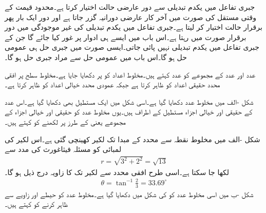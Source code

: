 جبری تفاعل میں یکدم تبدیلی سے دور عارضی حالت اختیار کرتا ہے۔محدود قیمت کے وقتی مستقل کی صورت میں آخر کار عارضی دورانیہ گزر جاتا ہے اور دور ایک بار پھر برقرار حالت اختیار کر لیتا ہے۔جبری تفاعل میں یکدم تبدیلی کی غیر موجودگی میں دور برقرار صورت میں رہتا ہے۔اس باب میں ایسے ہی ادوار پر غور کیا جائے گا جن کے جبری تفاعل میں یکدم تبدیلی نہیں پائی جاتی۔ایسی صورت میں جبری حل ہی عمومی حل ہو گا۔اس باب میں عمومی حل  سے مراد جبری حل ہو گا۔ 
 
 عدد اور  عدد کے مجموعے کو  عدد کہتے ہیں۔مخلوط اعداد کو  پر دکھایا جایا ہے۔مخلوط سطح پر افقی محدد حقیقی اعداد کو ظاہر کرتا ہے جبکہ عمودی محدد خیالی اعداد کو ظاہر کرتا ہے۔

شکل -الف میں مخلوط عدد  دکھایا گیا ہے۔اسی شکل میں ایک مستطیل بھی دکھایا گیا ہے۔اس عدد کے حقیقی اور خیالی اجزاء مستطیل کے اطراف ہیں۔یوں مخلوط عدد کو حقیقی اور خیالی اجزاء کے مجموعے یعنی  کے طرز پر لکھنے کو  کہتے ہیں۔ 

شکل -الف میں مخلوط نقطہ  سے محدد کے مبدا  تک لکیر کھینچی گئی ہے۔اس لکیر کی لمبائی  کو مسئلہ فیثاغورث کی مدد سے
\begin{align*}
r=\sqrt{3^2+2^2}=\sqrt{13}
\end{align*}
لکھا جا سکتا ہے۔اسی طرح افقی محدد سے لکیر تک کا زاویہ درج ذیل ہو گا۔
\begin{align*}
\theta=\tan^{-1}\frac{2}{3}=33.69^{\circ}
\end{align*}
شکل -ب میں اسی مخلوط عدد کو  کی شکل میں دکھایا گیا ہے۔مخلوط عدد کو حیطے اور زاویے سے ظاہر کرنے کو  کہتے ہیں۔

